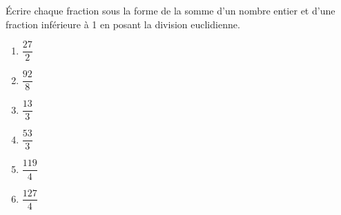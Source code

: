 \begin{exercice*}
   Écrire chaque fraction sous la forme de la somme d'un nombre entier et d'une fraction inférieure à 1 en posant la division euclidienne. \medskip
   \begin{multicols}{3}
      \begin{enumerate}
         \item $\dfrac{27}2$ \bigskip
         \item $\dfrac{92}8$ \bigskip
         \item $\dfrac{13}{3}$ \bigskip
         \item $\dfrac{53}{3}$ \bigskip
         \item $\dfrac{119}{4}$ \bigskip
         \item $\dfrac{127}{4}$
      \end{enumerate}
   \end{multicols}
\end{exercice*}